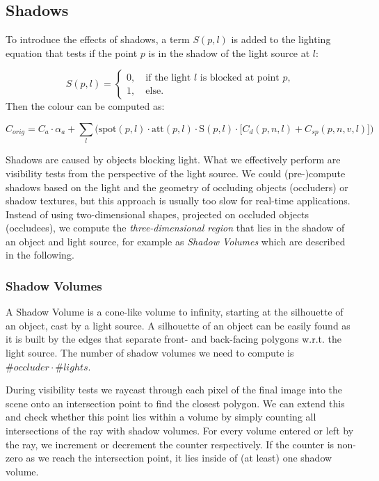 \documentclass[english]{panikzettel}
\begin{document}
\subsection{Shadows}

To introduce the effects of shadows, a term $S(p,l)$ is added to the lighting equation that tests if the point $p$ is in the shadow of the light source at $l$:

  $$ S(p,l) =\begin{cases}
    0, \quad \text{if the light } l \text{ is blocked at point } p, \\
    1, \quad \text{else}.
    \end{cases}$$
Then the colour can be computed as:

$$ C_{orig} =  C_a \cdot \alpha_a + \sum_l \bigg(\text{spot}(p,l) \cdot \text{att}(p,l) \cdot \text{S}(p,l) \cdot \big[C_d(p,n,l) + C_{sp}(p,n,v,l)\big]\bigg)
$$

Shadows are caused by objects blocking light. What we effectively perform are visibility tests from the perspective of the light source. We could (pre-)compute shadows based on the light and the geometry of occluding objects (occluders) or shadow textures, but this approach is usually too slow for real-time applications. Instead of using two-dimensional shapes, projected on occluded objects (occludees), we compute the \emph{three-dimensional region} that lies in the shadow of an object and light source, for example as \emph{Shadow Volumes} which are described in the following.

\subsubsection*{Shadow Volumes}

A Shadow Volume is a cone-like volume to infinity, starting at the silhouette of an object, cast by a light source. A silhouette of an object can be easily found as it is built by the edges that separate front- and back-facing polygons w.r.t. the light source. The number of shadow volumes we need to compute is $\# occluder \cdot \# lights$.

During visibility tests we raycast through each pixel of the final image into the scene onto an intersection point to find the closest polygon. We can extend this and check whether this point lies within a volume by simply counting all intersections of the ray with shadow volumes. For every volume entered or left by the ray, we increment or decrement the counter respectively. If the counter is non-zero as we reach the intersection point, it lies inside of (at least) one shadow volume.
\end{document}
